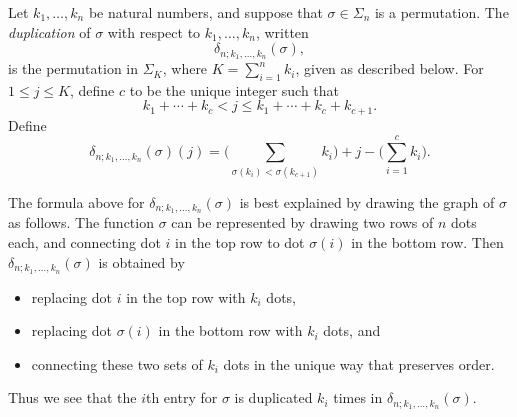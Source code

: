 \begin{Defi}[(Duplication)]\label{Defi:delta-s}
Let $k_1, \ldots, k_n$ be natural numbers, and suppose that $\sigma \in \Sigma_n$ is a permutation. The \emph{duplication} of $\sigma$ with respect to $k_1, \ldots, k_n$, written
\[
\delta_{n; k_1, \ldots, k_n}(\sigma),
\]
is the permutation in $\Sigma_K$, where $K = \sum_{i=1}^n k_i$, given as described below. 
For $1 \leq j \leq K$, define $c$ to be the unique integer such that
\[
k_1 + \cdots + k_c < j \leq k_1 + \cdots + k_c +k_{c+1}.
\]
Define
\[
\delta_{n; k_1, \ldots, k_n}(\sigma)(j) = \big( \sum_{\sigma(k_i) < \sigma(k_{c+1})} k_i\big) + j - \big( \sum_{i=1}^c k_i \big).
\]
\end{Defi}

\begin{rem}\label{rem:delta-s}
The formula above for $\delta_{n; k_1, \ldots, k_n}(\sigma)$ is best explained by drawing the graph of $\sigma$ as follows. The function $\sigma$ can be represented by drawing two rows of $n$ dots each, and connecting dot $i$ in the top row to dot $\sigma(i)$ in the bottom row. Then $\delta_{n; k_1, \ldots, k_n}(\sigma)$ is obtained by 
\begin{itemize}
\item replacing dot $i$ in the top row with $k_i$ dots,
\item replacing dot $\sigma(i)$ in the bottom row with $k_i$ dots, and
\item connecting these two sets of $k_i$ dots in the unique way that preserves order.
\end{itemize}
Thus we see that the $i$th entry for $\sigma$ is duplicated $k_i$ times in $\delta_{n; k_1, \ldots, k_n}(\sigma)$.
\end{rem}


